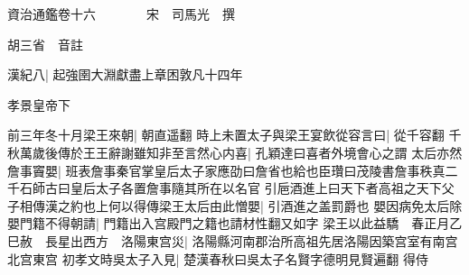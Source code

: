 






























































資治通鑑卷十六　　　　宋　司馬光　撰

胡三省　音註

漢紀八|{
	起強圉大淵獻盡上章困敦凡十四年}


孝景皇帝下

前三年冬十月梁王來朝|{
	朝直遥翻}
時上未置太子與梁王宴飲從容言曰|{
	從千容翻}
千秋萬歲後傳於王王辭謝雖知非至言然心内喜|{
	孔穎達曰喜者外境會心之謂}
太后亦然詹事竇嬰|{
	班表詹事秦官掌皇后太子家應劭曰詹省也給也臣瓚曰茂陵書詹事秩真二千石師古曰皇后太子各置詹事隨其所在以名官}
引巵酒進上曰天下者高祖之天下父子相傳漢之約也上何以得傳梁王太后由此憎嬰|{
	引酒進之盖罰爵也}
嬰因病免太后除嬰門籍不得朝請|{
	門籍出入宫殿門之籍也請材性翻又如字}
梁王以此益驕　春正月乙巳赦　長星出西方　洛陽東宫災|{
	洛陽縣河南郡治所高祖先居洛陽因築宫室有南宫北宫東宫}
初孝文時吳太子入見|{
	楚漢春秋曰吳太子名賢字德明見賢遍翻}
得侍

